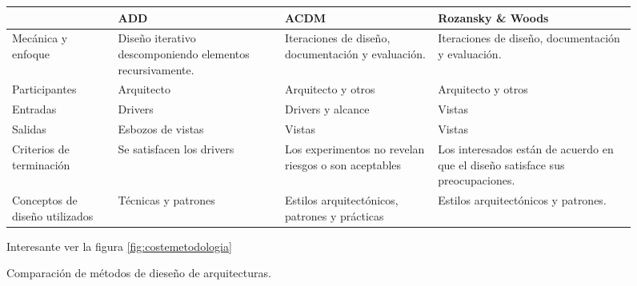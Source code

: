 \begin{figure}[h]
  \centering
  \begin{tabular}[h]{p{2.5cm} || p{3cm} | p{3cm} | p{5cm}}
    &\textbf{ADD}&\textbf{ACDM}&\textbf{Rozansky \& Woods} \\ \hline
    Mecánica y enfoque & Diseño iterativo descomponiendo elementos
                         recursivamente. & Iteraciones de diseño,
                                          documentación y
                                          evaluación. & Iteraciones de diseño,
                                                        documentación y
                                                        evaluación. \\\hline
    Participantes & Arquitecto & Arquitecto y otros & Arquitecto y
                                                      otros \\\hline
    Entradas & Drivers & Drivers y alcance & Vistas \\\hline
    Salidas & Esbozos de vistas & Vistas & Vistas \\\hline
    Criterios de terminación & Se satisfacen los drivers & Los
                                                           experimentos
                                                           no revelan
                                                           riesgos o
                                                           son
                                                           aceptables
                               & Los interesados están de acuerdo en
                                 que el diseño satisface sus
                                 preocupaciones. \\\hline
    Conceptos de diseño utilizados & Técnicas y patrones & Estilos
                                                           arquitectónicos,
                                                           patrones y
                                                           prácticas &
                                                                       Estilos
                                                                       arquitectónicos
                                                                       y patrones.
    \end{tabular}  
  \caption[Comparación diseño arquitecturas]{Comparación de métodos de
    dieseño de arquitecturas.}
  Interesante ver la figura \ref{fig:costemetodologia}
  \label{fig:comparaciondiseñoarquitectura}
\end{figure}


